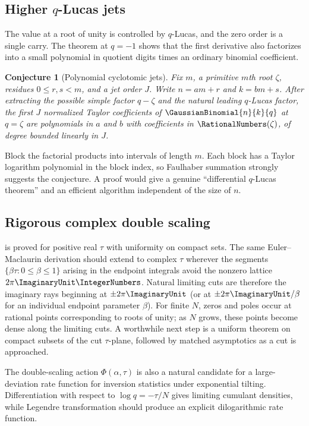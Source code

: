 \documentclass[11pt,oneside]{article}
\newtheorem{conjecture}[theorem]{Conjecture}
\theoremstyle{definition}
\theoremstyle{remark}
\let\reportsubsection\subsection
\let\section\reportsubsection
\begin{document}
\section{Higher \texorpdfstring{$q$}{q}-Lucas jets}

The value at a root of unity is controlled by $q$-Lucas, and the zero order is a
single carry.  The theorem at $q=-1$ shows that the first derivative also
factorizes into a small polynomial in quotient digits times an ordinary
binomial coefficient.

\begin{conjecture}[Polynomial cyclotomic jets]\label{conj:polynomial-jets}
Fix $m$, a primitive $m$th root $\zeta$, residues
$0\le r,s<m$, and a jet order $J$.  Write $n=am+r$ and $k=bm+s$.  After
extracting the possible simple factor $q-\zeta$ and the natural leading
$q$-Lucas factor, the first $J$ normalized Taylor coefficients of
$\GaussianBinomial{n}{k}{q}$ at $q=\zeta$ are polynomials in $a$ and $b$ with coefficients in
$\RationalNumbers(\zeta)$, of degree bounded linearly in $J$.
\end{conjecture}

Block the factorial products into intervals of length $m$.  Each block has a
Taylor logarithm polynomial in the block index, so Faulhaber summation strongly
suggests the conjecture.  A proof would give a genuine ``differential
$q$-Lucas theorem'' and an efficient algorithm independent of the size of
$n$.

\section{Rigorous complex double scaling}

 is proved for positive real $\tau$ with uniformity on
compact sets.  The same Euler--Maclaurin derivation should extend to complex
$\tau$ wherever the segments
$\{\beta\tau:0\le\beta\le1\}$ arising in the endpoint integrals avoid the
nonzero lattice $2\pi\ImaginaryUnit\IntegerNumbers$.  Natural limiting cuts are therefore the imaginary
rays beginning at $\pm2\pi\ImaginaryUnit$ (or at $\pm2\pi\ImaginaryUnit/\beta$ for an individual
endpoint parameter $\beta$).  For finite $N$, zeros and poles occur at rational
points corresponding to roots of unity; as $N$ grows, these points become
dense along the limiting cuts.  A worthwhile next step is a uniform theorem on
compact subsets of the cut $\tau$-plane, followed by matched asymptotics as a
cut is approached.

The double-scaling action $\Phi(\alpha,\tau)$ is also a natural candidate for a
large-deviation rate function for inversion statistics under exponential
tilting.  Differentiation with respect to $\log q=-\tau/N$ gives limiting
cumulant densities, while Legendre transformation should produce an explicit
dilogarithmic rate function.
\end{document}
